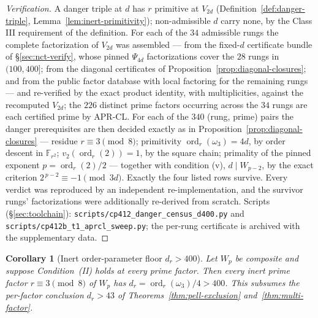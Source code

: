 \documentclass[11pt]{amsart}
\theoremstyle{plain}
\newtheorem{corollary}[theorem]{Corollary}
\theoremstyle{definition}
\theoremstyle{remark}
\numberwithin{equation}{section}
\newcommand{\ord}{\operatorname{ord}}
\newcommand{\F}{\mathbb{F}}
\begin{document}
\begin{proof}[Verification]
A danger triple at $d$ has $r$ primitive at $V_{2 d}$ (Definition~\ref{def:danger-triple}, Lemma~\ref{lem:inert-primitivity}); non-admissible $d$ carry none, by the Class III requirement of the definition. For each of the $34$ admissible rungs the complete factorization of $V_{2 d}$ was assembled --- from the fixed-$d$ certificate bundle of \S\ref{sec:nct-verify}, whose pinned $\Psi_{4 d}$ factorizations cover the $28$ rungs in $(100, 400]$; from the diagonal certificates of Proposition~\ref{prop:diagonal-closures}; and from the public factor database \cite{ref:FactorDB} with local factoring for the remaining rungs --- and re-verified by the exact product identity, with multiplicities, against the recomputed $V_{2 d}$; the $226$ distinct prime factors occurring across the $34$ rungs are each certified prime by APR-CL. For each of the $340$ (rung, prime) pairs the danger prerequisites are then decided exactly as in Proposition~\ref{prop:diagonal-closures} --- residue $r \equiv 3 \pmod 8$; primitivity $\ord_r(\omega_3) = 4 d$, by order descent in $\F_{r^2}$; $v_2(\ord_r(2)) = 1$, by the square chain; primality of the pinned exponent $p = \ord_r(2)/2$ --- together with condition (v), $d \mid W_{p-2}$, by the exact criterion $2^{\,p-2} \equiv -1 \pmod{3 d}$. Exactly the four listed rows survive. Every verdict was reproduced by an independent re-implementation, and the survivor rungs' factorizations were additionally re-derived from scratch. Scripts (\S\ref{sec:toolchain}): \texttt{scripts/}\allowbreak\texttt{cp412\_danger\_}\allowbreak\texttt{census\_}\allowbreak\texttt{d400.py} and \texttt{scripts/}\allowbreak\texttt{cp412b\_t1\_}\allowbreak\texttt{aprcl\_}\allowbreak\texttt{sweep.py}; the per-rung certificate is archived with the supplementary data.
\end{proof}

\begin{corollary}[Inert order-parameter floor $d_r > 400$]\label{cor:inert-floor-400}
Let $W_p$ be composite and suppose Condition~(II) holds at every prime factor. Then every inert prime factor $r \equiv 3 \pmod 8$ of $W_p$ has $d_r = \ord_r(\omega_3)/4 > 400$. This subsumes the per-factor conclusion $d_r > 43$ of Theorems~\ref{thm:pell-exclusion} and~\ref{thm:multi-factor}.
\end{corollary}
\end{document}
